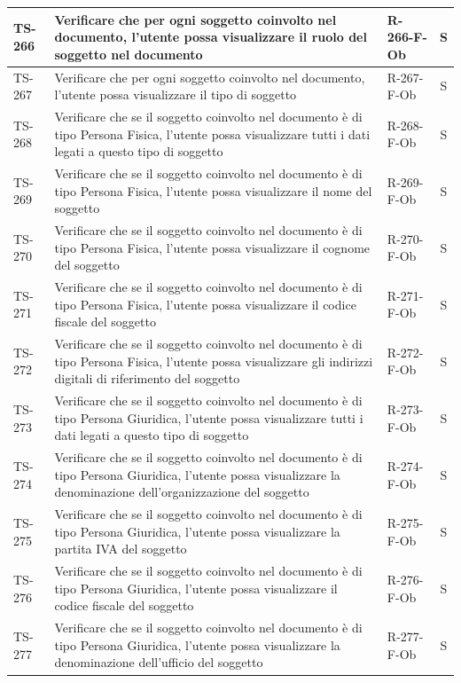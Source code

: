\documentclass[a4paper,12pt]{article}
\begin{document}
\begin{longtable}{|p{1.5cm}|p{8.3cm}|p{2.4cm}|c|}
\hline
TS-266 & Verificare che per ogni soggetto coinvolto nel documento, l'utente possa visualizzare il ruolo del soggetto nel documento & R-266-F-Ob & S \\
\hline
TS-267 & Verificare che per ogni soggetto coinvolto nel documento, l'utente possa visualizzare il tipo di soggetto & R-267-F-Ob & S \\
\hline
TS-268 & Verificare che se il soggetto coinvolto nel documento è di tipo Persona Fisica, l'utente possa visualizzare tutti i dati legati a questo tipo di soggetto & R-268-F-Ob & S \\
\hline
TS-269 & Verificare che se il soggetto coinvolto nel documento è di tipo Persona Fisica, l'utente possa visualizzare il nome del soggetto & R-269-F-Ob & S \\
\hline
TS-270 & Verificare che se il soggetto coinvolto nel documento è di tipo Persona Fisica, l'utente possa visualizzare il cognome del soggetto & R-270-F-Ob & S \\
\hline
TS-271 & Verificare che se il soggetto coinvolto nel documento è di tipo Persona Fisica, l'utente possa visualizzare il codice fiscale del soggetto & R-271-F-Ob & S \\
\hline
TS-272 & Verificare che se il soggetto coinvolto nel documento è di tipo Persona Fisica, l'utente possa visualizzare gli indirizzi digitali di riferimento del soggetto & R-272-F-Ob & S \\
\hline
TS-273 & Verificare che se il soggetto coinvolto nel documento è di tipo Persona Giuridica, l'utente possa visualizzare tutti i dati legati a questo tipo di soggetto & R-273-F-Ob & S \\
\hline
TS-274 & Verificare che se il soggetto coinvolto nel documento è di tipo Persona Giuridica, l'utente possa visualizzare la denominazione dell'organizzazione del soggetto & R-274-F-Ob & S \\
\hline
TS-275 & Verificare che se il soggetto coinvolto nel documento è di tipo Persona Giuridica, l'utente possa visualizzare la partita IVA del soggetto & R-275-F-Ob & S \\
\hline
TS-276 & Verificare che se il soggetto coinvolto nel documento è di tipo Persona Giuridica, l'utente possa visualizzare il codice fiscale del soggetto & R-276-F-Ob & S \\
\hline
TS-277 & Verificare che se il soggetto coinvolto nel documento è di tipo Persona Giuridica, l'utente possa visualizzare la denominazione dell'ufficio del soggetto & R-277-F-Ob & S \\

\end{longtable}
\end{document}
